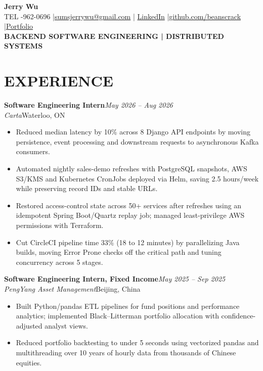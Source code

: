 \documentclass[11pt,letterpaper]{article}
\begin{document}
\begin{center}
  {\fontsize{16.7}{18}\selectfont\bfseries Jerry Wu}\\[-1pt]
  {\footnotesize TEL -962-0696 \enspace|\enspace \href{mailto:sumsjerrywu@gmail.com}{sumsjerrywu@gmail.com} \enspace|\enspace
  \href{https://www.linkedin.com/in/jerry-wu-03210a30b/}{LinkedIn} \enspace|\enspace \href{https://github.com/beanscrack}{github.com/beanscrack} \enspace|\enspace \href{https://website-beta-seven-81.vercel.app/}{Portfolio}}\\[1pt]
  {\fontsize{8.1}{9}\selectfont\bfseries BACKEND SOFTWARE ENGINEERING  |  DISTRIBUTED SYSTEMS}
\end{center}
\vspace{-5pt}
\section*{EXPERIENCE}
\noindent\textbf{Software Engineering Intern}\hfill \textit{May 2026 -- Aug 2026}\\
\textit{Carta}\hfill Waterloo, ON\par
\begin{itemize}
\item Reduced median latency by 10\% across 8 Django API endpoints by moving persistence, event processing and downstream requests to asynchronous Kafka consumers.
\item Automated nightly sales-demo refreshes with PostgreSQL snapshots, AWS S3/KMS and Kubernetes CronJobs deployed via Helm, saving 2.5 hours/week while preserving record IDs and stable URLs.
\item Restored access-control state across 50+ services after refreshes using an idempotent Spring Boot/Quartz replay job; managed least-privilege AWS permissions with Terraform.
\item Cut CircleCI pipeline time 33\% (18 to 12 minutes) by parallelizing Java builds, moving Error Prone checks off the critical path and tuning concurrency across 5 stages.
\end{itemize}
\noindent\textbf{Software Engineering Intern, Fixed Income}\hfill \textit{May 2025 -- Sep 2025}\\
\textit{PengYang Asset Management}\hfill Beijing, China\par
\begin{itemize}
\item Built Python/pandas ETL pipelines for fund positions and performance analytics; implemented Black--Litterman portfolio allocation with confidence-adjusted analyst views.
\item Reduced portfolio backtesting to under 5 seconds using vectorized pandas and multithreading over 10 years of hourly data from thousands of Chinese equities.
\end{itemize}
\end{document}
